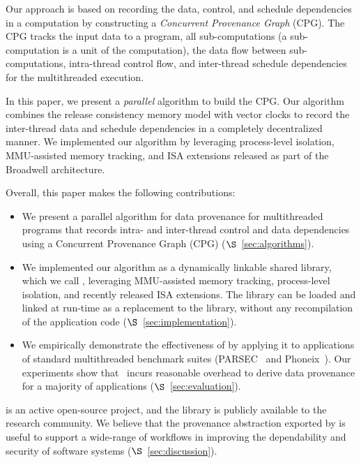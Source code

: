 Our approach is based on recording the data, control, and schedule dependencies in a computation by constructing a {\em Concurrent Provenance Graph} (CPG). The CPG tracks the input data to a program, all sub-computations (a sub-computation is a unit of the computation), the data flow between sub-computations, intra-thread control flow, and inter-thread schedule dependencies for the multithreaded execution. 


In this paper, we present a {\em parallel} algorithm to build the CPG. Our algorithm combines the release consistency memory model with vector clocks to record the inter-thread data and schedule dependencies in a completely decentralized  manner. We implemented our algorithm by leveraging process-level isolation, MMU-assisted memory tracking, and \intelpt ISA extensions released as part of the Broadwell architecture.



Overall, this paper makes the following contributions:
\begin{itemize}

\item We present a parallel algorithm for data provenance for multithreaded programs that records intra- and inter-thread control and data dependencies using a Concurrent Provenance Graph (CPG) ($\S$~\ref{sec:algorithms}).

\item We implemented our algorithm as a dynamically linkable shared library, which we call \projecttitle, leveraging MMU-assisted memory tracking, process-level isolation, and recently released \intelpt ISA extensions.  The \projecttitle library can be loaded and linked at run-time as a replacement to the \pthreads library, without any recompilation  of the application code ($\S$~\ref{sec:implementation}).

\item  We  empirically demonstrate  the effectiveness of \projecttitle by applying it to applications of standard multithreaded benchmark suites (PARSEC~\cite{parsec} and Phoneix~\cite{phoenix}). Our experiments show that \projecttitle~incurs reasonable overhead to derive data provenance for a majority of applications ($\S$~\ref{sec:evaluation}). 

\end{itemize}

\projecttitle is an active open-source project, and the library is publicly available to the research community. We believe that the provenance abstraction exported by \projecttitle is useful to support a wide-range of workflows in improving the dependability and security of software systems ($\S$~\ref{sec:discussion}).
